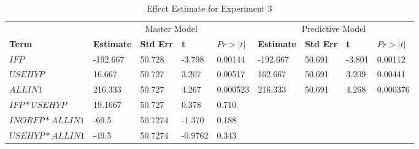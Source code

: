 \documentclass[preprint]{sigplanconf}
\begin{document}
\begin{table}
  \centering
  \begin{tabular}{l|llll|llll}
    \multicolumn{1}{c|}{}&\multicolumn{4}{c|}{Master Model}&\multicolumn{4}{c}{Predictive Model}\\
    \bf{Term}&\bf{Estimate}&\bf{Std Err}&\bf{t}&\bf{$Pr>|t|$}&\bf{Estimate}&\bf{Std Err}&\bf{t}&\bf{$Pr>|t|$}\\
    \hline
    $IFP$&-192.667&50.728&-3.798&0.00144&-192.667&50.691&-3.801&0.00112\\
    $USEHYP$&16.667&50.727&3.207&0.00517&162.667&50.691&3.209&0.00441\\
    $ALLIN1$&216.333&50.727&4.267&0.000523&216.333&50.691&4.268&0.000376\\
    $IFP*USEHYP$&19.1667&50.727&0.378&0.710&&&&\\
    $INORFP*ALLIN1$&-69.5&50.7274&-1.370&0.188&&&&\\
    $USEHYP*ALLIN1$&-49.5&50.7274&-0.9762&0.343&&&&\\
  \end{tabular}
  \caption{Effect Estimate for Experiment 3}
  \label{tab:EffectEstimates3}
\end{table}
\end{document}
